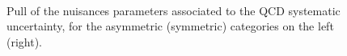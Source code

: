



\begin{figure}[tbhp]
    \caption{ Pull of the nuisances parameters associated to the QCD systematic uncertainty, 
      for the asymmetric (symmetric) categories on the left (right).
      \label{fig:nuisPull_qcd}}
  \begin{center}
     ~~
  \end{center}
\end{figure}


